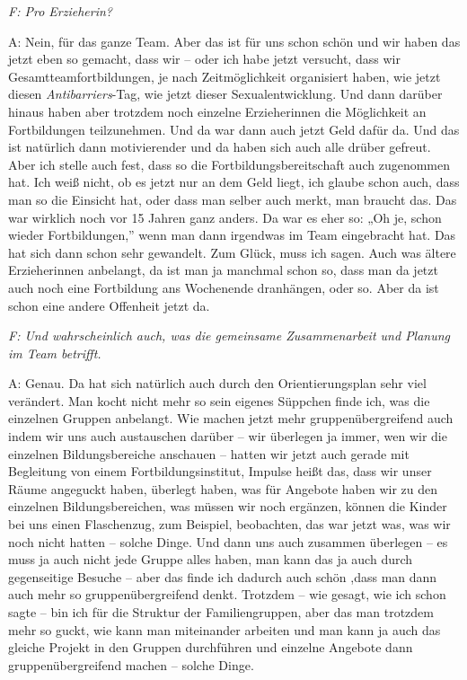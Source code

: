 \begin{linenumbers*}
\emph{F: Pro Erzieherin?}

A: Nein, für das ganze Team. Aber das ist für uns schon schön und wir haben das jetzt eben so gemacht, dass wir – oder ich habe jetzt versucht, dass wir Gesamtteamfortbildungen, je nach Zeitmöglichkeit organisiert haben, wie jetzt diesen \emph{Antibarriers}-Tag, wie jetzt dieser Sexualentwicklung. Und dann darüber hinaus haben aber trotzdem noch einzelne Erzieherinnen die Möglichkeit an Fortbildungen teilzunehmen. Und da war dann auch jetzt Geld dafür da. Und das ist natürlich dann motivierender und da haben sich auch alle drüber gefreut. Aber ich stelle auch fest, dass so die Fortbildungsbereitschaft auch zugenommen hat. Ich weiß nicht, ob es jetzt nur an dem Geld liegt, ich glaube schon auch, dass man so die Einsicht hat, oder dass man selber auch merkt, man braucht das. Das war wirklich noch vor 15 Jahren ganz anders. Da war es eher so: „Oh je, schon wieder Fortbildungen,” wenn man dann irgendwas im Team eingebracht hat. Das hat sich dann schon sehr gewandelt. Zum Glück, muss ich sagen. Auch was ältere Erzieherinnen anbelangt, da ist man ja manchmal schon so, dass man da jetzt auch noch eine Fortbildung ans Wochenende dranhängen, oder so. Aber da ist schon eine andere Offenheit jetzt da.

\emph{F: Und wahrscheinlich auch, was die gemeinsame Zusammenarbeit und Planung im Team betrifft.}

A: Genau. Da hat sich natürlich auch durch den Orientierungsplan sehr viel verändert. Man kocht nicht mehr so sein eigenes Süppchen finde ich, was die einzelnen Gruppen anbelangt. Wie machen jetzt mehr gruppenübergreifend auch indem wir uns auch austauschen darüber – wir überlegen ja immer, wen wir die einzelnen Bildungsbereiche anschauen – hatten wir jetzt auch gerade mit Begleitung von einem Fortbildungsinstitut, Impulse heißt das, dass wir unser Räume angeguckt haben, überlegt haben, was für Angebote haben wir zu den einzelnen Bildungsbereichen, was müssen wir noch ergänzen, können die Kinder bei uns einen Flaschenzug, zum Beispiel, beobachten, das war jetzt was, was wir noch nicht hatten – solche Dinge. Und dann uns auch zusammen überlegen – es muss ja auch nicht jede Gruppe alles haben, man kann das ja auch durch gegenseitige Besuche – aber das finde ich dadurch auch schön ,dass man dann auch mehr so gruppenübergreifend denkt. Trotzdem – wie gesagt, wie ich schon sagte – bin ich für die Struktur der Familiengruppen, aber das man trotzdem mehr so guckt, wie kann man miteinander arbeiten und man kann ja auch das gleiche Projekt in den Gruppen durchführen und einzelne Angebote dann gruppenübergreifend machen – solche Dinge.


\end{linenumbers*}
